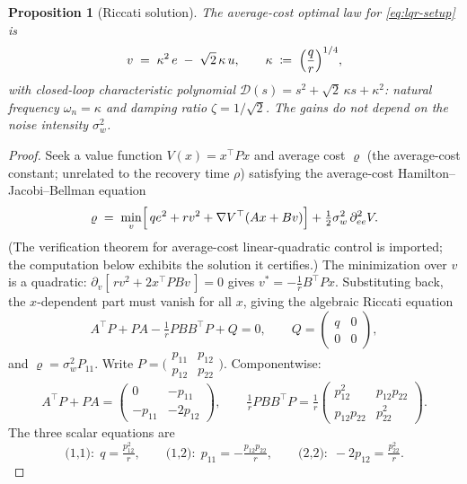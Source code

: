 \documentclass[11pt, a4paper]{article}
\theoremstyle{definition}
\theoremstyle{plain}
\newtheorem{proposition}[theorem]{Proposition}
\theoremstyle{remark}
\begin{document}
\begin{proposition}[Riccati solution]\label{prop:riccati}
The average-cost optimal law for \cref{eq:lqr-setup} is
\begin{equation}\label{eq:lqr-law}
  v \;=\; \kappa^2\, e \;-\; \sqrt2\,\kappa\, u,
  \qquad
  \kappa \;\coloneqq\; \Bigl(\frac{q}{r}\Bigr)^{1/4},
\end{equation}
with closed-loop characteristic polynomial
$\mathcal{D}(s) = s^2 + \sqrt2\,\kappa s + \kappa^2$: natural frequency
$\omega_n = \kappa$ and damping ratio $\zeta = 1/\sqrt2$.  The gains do
not depend on the noise intensity $\sigma_w^2$.
\end{proposition}

\begin{proof}
Seek a value function $V(x) = x^\top P x$ and average cost
$\varrho$ (the average-cost constant; unrelated to the recovery time
$\rho$)
satisfying the average-cost Hamilton--Jacobi--Bellman equation
\[
  \varrho \;=\; \min_v\Bigl[\, q e^2 + r v^2
    + \nabla V^\top (Ax + Bv)\Bigr]
    + \tfrac12 \sigma_w^2\,\partial^2_{ee} V .
\]
(The verification theorem for average-cost linear-quadratic control is
imported; the computation below exhibits the solution it certifies.)
The minimization over $v$ is a quadratic:
$\partial_v[\,rv^2 + 2x^\top P B v\,] = 0$ gives
$v^* = -\tfrac1r B^\top P x$.  Substituting back, the $x$-dependent part
must vanish for all $x$, giving the algebraic Riccati equation
\[
  A^\top P + PA - \tfrac1r PBB^\top P + Q = 0,
  \qquad Q = \begin{pmatrix} q&0\\0&0\end{pmatrix},
\]
and $\varrho = \sigma_w^2 P_{11}$.  Write
$P = \bigl(\begin{smallmatrix} p_{11}&p_{12}\\
p_{12}&p_{22}\end{smallmatrix}\bigr)$.  Componentwise:
\[
  A^\top P + PA
  = \begin{pmatrix} 0 & -p_{11}\\ -p_{11} & -2p_{12}\end{pmatrix},
  \qquad
  \tfrac1r PBB^\top P
  = \tfrac1r\begin{pmatrix} p_{12}^2 & p_{12}p_{22}\\
     p_{12}p_{22} & p_{22}^2\end{pmatrix}.
\]
The three scalar equations are
\[
  \text{(1,1)}:\; q = \tfrac{p_{12}^2}{r},
  \qquad
  \text{(1,2)}:\; p_{11} = -\tfrac{p_{12}p_{22}}{r},
  \qquad
  \text{(2,2)}:\; -2p_{12} = \tfrac{p_{22}^2}{r}.
\]
\end{proof}
\end{document}

